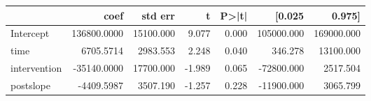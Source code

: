 \begin{tabular}{lrrrrrr}
\hline
{} &         coef &    std err &      t &  P>|t| &      [0.025 &      0.975] \\
\hline
Intercept    &  136800.0000 &  15100.000 &  9.077 &  0.000 &  105000.000 &  169000.000 \\
time         &    6705.5714 &   2983.553 &  2.248 &  0.040 &     346.278 &   13100.000 \\
intervention &  -35140.0000 &  17700.000 & -1.989 &  0.065 &  -72800.000 &    2517.504 \\
postslope    &   -4409.5987 &   3507.190 & -1.257 &  0.228 &  -11900.000 &    3065.799 \\
\hline
\end{tabular}
